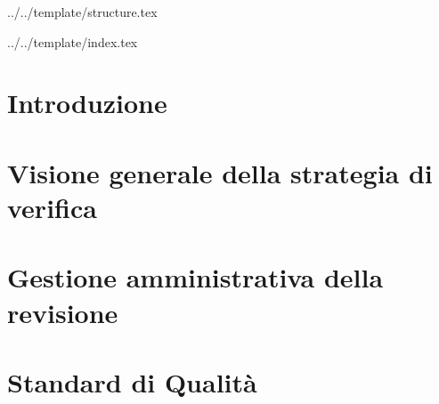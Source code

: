 


\def\DOCUMENTO{Piano di Qualifica}
\def\VERSIONE{1.0.0}

\def\REDATTORE {Bogdan Suierica \\ & Crespan Emanuele}
\def\VERIFICATORE {Burlin Valerio}
\def\RESPONSABILE {Agostinetto Matteo}

\def\USO {Esterno}

\def\DISTRIBUZIONE {\GRUPPO{}\\ & \COMMITTENTE{}\\}

\def\DESCRIZIONE {Documento riguardante le strategie di verifica e validazione adottate dal gruppo \GRUPPO\ necessarie ad assicurare i requisiti qualitativi nello svolgimento del progetto \PROGETTO}


\def\INDICE	{true}
\def\TABELLE {false}
\def\FIGURE {true}


 {../../template/structure.tex}


 {../../template/index.tex}



%

\section{Introduzione}


\newpage
\section{Visione generale della strategia di verifica}


\newpage
\section{Gestione amministrativa della revisione}


\newpage
\appendix
\section{Standard di Qualità}





